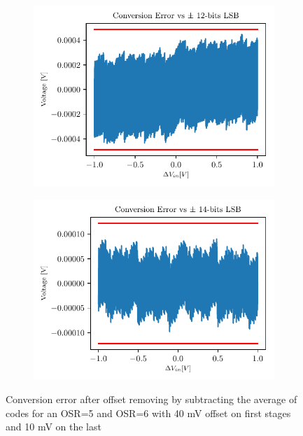 \begin{figure}[htp]
	\centering
	\begin{subfigure}[b]{0.48\textwidth}
		\centering
		\includegraphics[width=\textwidth]{Chapter4/Figs/results/adc/adc_osr5_40mV-40mV-10mV-error.pdf}
		\label{fig:adc-osr5-error-offset}
	\end{subfigure}
	\begin{subfigure}[b]{0.48\textwidth}
		\centering
		\includegraphics[width=\textwidth]{Chapter4/Figs/results/adc/adc_osr6_40mV-40mV-10mV-error.pdf}
		\label{fig:adc-osr6-error-offset}
	\end{subfigure}
	\caption{Conversion error after offset removing by subtracting the average of codes for an OSR=5 and OSR=6 with 40 mV offset on first stages and 10 mV on the last}
	\label{fig:adc-osr-error-offset}
\end{figure}

